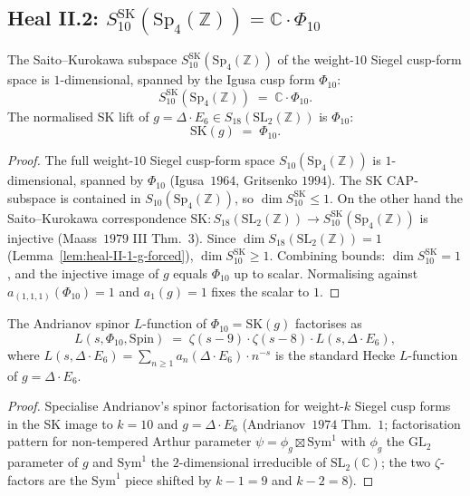 \subsection*{Heal II.2: $S_{10}^{\mathrm{SK}}(\mathrm{Sp}_4(\mathbb{Z}))
= \mathbb{C} \cdot \Phi_{10}$}

\begin{lemma}
\label{lem:sk-target-phi10}
The Saito--Kurokawa subspace $S_{10}^{\mathrm{SK}}(\mathrm{Sp}_4(\mathbb{Z}))$
of the weight-$10$ Siegel cusp-form space is $1$-dimensional, spanned
by the Igusa cusp form $\Phi_{10}$:
\[
 S_{10}^{\mathrm{SK}}(\mathrm{Sp}_4(\mathbb{Z})) \;=\; \mathbb{C} \cdot
 \Phi_{10}.
\]
The normalised SK lift of $g = \Delta \cdot E_6 \in S_{18}(\mathrm{SL}_2(\mathbb{Z}))$
is $\Phi_{10}$:
\[
 \mathrm{SK}(g) \;=\; \Phi_{10}.
\]
\end{lemma}

\begin{proof}
The full weight-$10$ Siegel cusp-form space $S_{10}(\mathrm{Sp}_4(\mathbb{Z}))$
is $1$-dimensional, spanned by $\Phi_{10}$ (Igusa~$1964$, Gritsenko
$1994$).  The SK CAP-subspace is contained in $S_{10}(\mathrm{Sp}_4(\mathbb{Z}))$,
so $\dim S_{10}^{\mathrm{SK}} \leq 1$.  On the other hand the
Saito--Kurokawa correspondence $\mathrm{SK}\colon S_{18}(\mathrm{SL}_2(\mathbb{Z}))
\to S_{10}^{\mathrm{SK}}(\mathrm{Sp}_4(\mathbb{Z}))$ is injective
(Maass~$1979$ III Thm.~$3$).  Since $\dim S_{18}(\mathrm{SL}_2(\mathbb{Z}))
= 1$ (Lemma~\ref{lem:heal-II-1-g-forced}), $\dim S_{10}^{\mathrm{SK}}
\geq 1$.  Combining bounds: $\dim S_{10}^{\mathrm{SK}} = 1$, and
the injective image of $g$ equals $\Phi_{10}$ up to scalar.
Normalising against $a_{(1, 1, 1)}(\Phi_{10}) = 1$ and $a_1(g) = 1$
fixes the scalar to $1$.
\end{proof}

\begin{proposition}[Andrianov spinor factorisation with $g = \Delta \cdot E_6$]
\label{prop:andrianov-factorisation-delta-e6}
The Andrianov spinor $L$-function of $\Phi_{10} = \mathrm{SK}(g)$
factorises as
\[
 L(s, \Phi_{10}, \mathrm{Spin}) \;=\; \zeta(s - 9) \cdot \zeta(s - 8)
 \cdot L(s, \Delta \cdot E_6),
\]
where $L(s, \Delta \cdot E_6) = \sum_{n \geq 1} a_n(\Delta \cdot E_6)
\cdot n^{-s}$ is the standard Hecke $L$-function of $g = \Delta
\cdot E_6$.
\end{proposition}

\begin{proof}
Specialise Andrianov's spinor factorisation for weight-$k$ Siegel
cusp forms in the SK image to $k = 10$ and $g = \Delta \cdot E_6$
(Andrianov~$1974$ Thm.~$1$; factorisation pattern for non-tempered
Arthur parameter $\psi = \phi_g \boxtimes \mathrm{Sym}^1$ with
$\phi_g$ the $\mathrm{GL}_2$ parameter of $g$ and $\mathrm{Sym}^1$
the $2$-dimensional irreducible of $\mathrm{SL}_2(\mathbb{C})$; the
two $\zeta$-factors are the $\mathrm{Sym}^1$ piece shifted by
$k - 1 = 9$ and $k - 2 = 8$).
\end{proof}

